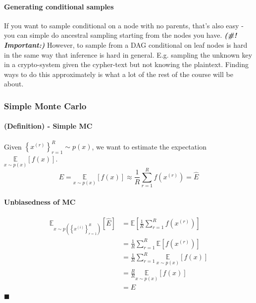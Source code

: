 \documentclass[11pt]{article}
\newcommand{\qed}{\hfill $\blacksquare$}
\begin{document}
\paragraph{Generating conditional samples} If you want to sample conditional on a node with no parents, that's also easy - you can simple do ancestral sampling starting from the nodes you have. \newline \newline
\textit{\textbf{(\#! Important:)}} However, to sample from a DAG conditional on leaf nodes is hard in the same way that inference is hard in general. E.g. sampling the unknown key in a crypto-system given the cypher-text but not knowing the plaintext. Finding ways to do this approximately is what a lot of the rest of the course will be about.

\subsubsection{Simple Monte Carlo}
\paragraph{(Definition) - Simple MC} Given $\left\{x^{(r)}\right\}_{r=1}^{R} \sim p(x)$, we want to estimate the expectation $\underset{x \sim p(x)}{\mathbb{E}}[f(x)]$.
\begin{equation}
    E=\underset{x \sim p(x)}{\mathbb{E}}[f(x)] \approx \frac{1}{R} \sum_{r=1}^{R} f\left(x^{(r)}\right)=\hat{E}
\end{equation}
\paragraph{Unbiasedness of MC}
\begin{align}
    \mathbb{E}_{x \sim p\left(\left\{x^{(i)}\right\}_{r=1}^{R}\right)}[\hat{E}]
    &=\mathbb{E}\left[\frac{1}{R} \sum_{r=1}^{R} f\left(x^{(r)}\right)\right] \\
    &= \frac{1}{R} \sum_{r=1}^{R} \mathbb{E}\left[f\left(x^{(r)}\right)\right]\\
    &= \frac{1}{R} \sum_{r=1}^{R} \underset{x \sim p(x)}{\mathbb{E}}[f(x)] \\
    &= \frac{R}{R} \underset{x \sim p(x)}{\mathbb{E}}[f(x)] \\
    &= E
\end{align}
\qed
\end{document}
